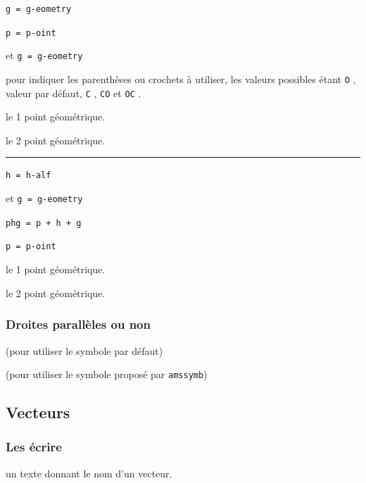 \documentclass[12pt,a4paper]{book}
\theoremstyle{definition}
\newcommand\separation{
	\medskip
	\hfill\rule{0.5\textwidth}{0.75pt}\hfill
	\medskip
}
\newcommand\extraspace{
	\vspace{0.25em}
}
\newcommand\mwhyprefix[2]{%
	\texttt{#1 = #1-#2}%
}
\newcommand\prefix[1]{%
	\texttt{#1}%
}
\begin{document}
{{   \hfill \mwhyprefix{g}{eometry}

  \hfill \mwhyprefix{p}{oint}
                              et \mwhyprefix{g}{eometry}

\IDoption{} pour indiquer les parenthèses ou crochets à utiliser, les valeurs possibles étant \prefix{O}, valeur par défaut, \prefix{C}, \prefix{CO} et \prefix{OC}.

 le 1\ier{} point géométrique.

 le 2\ieme{} point géométrique.


\separation


   \hfill \mwhyprefix{h}{alf}
                             et \mwhyprefix{g}{eometry}

  \hfill \prefix{phg = p + h + g}

\extraspace


  \hfill \mwhyprefix{p}{oint}

 le 1\ier{} point géométrique.

 le 2\ieme{} point géométrique.




\subsubsection{Droites parallèles ou non}





\extraspace

 (pour utiliser le symbole par défaut)

 (pour utiliser le symbole proposé par \verb+amssymb+)


\subsection{Vecteurs}

\subsubsection{Les écrire}




\IDarg{} un texte donnant le nom d'un vecteur.


}}
\end{document}
